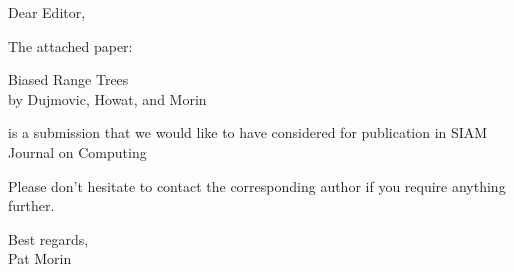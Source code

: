 \documentclass{article}
\begin{document}
Dear Editor,

The attached paper:

Biased Range Trees \\
by Dujmovic, Howat, and Morin

is a submission that we would like to have considered for publication
in SIAM Journal on Computing

Please don't hesitate to contact the corresponding author if you
require anything further.

\noindent
Best regards, \\
Pat Morin
\end{document}
